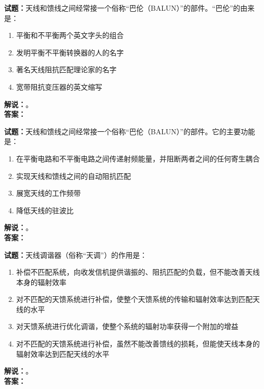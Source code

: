 \documentclass{ctexbook}
\begin{document}
\vspace{\baselineskip}

\noindent\textbf{试题：}天线和馈线之间经常接一个俗称“巴伦（BALUN）”的部件。“巴伦”的由来是：
\begin{enumerate}[leftmargin=3em]
  \item 平衡和不平衡两个英文字头的组合
  \item 发明平衡不平衡转换器的人的名字
  \item 著名天线阻抗匹配理论家的名字
  \item 宽带阻抗变压器的英文缩写
\end{enumerate}
\noindent\textbf{解说：}\textbf{}。\\\noindent\textbf{答案：}

\vspace{\baselineskip}

\noindent\textbf{试题：}天线和馈线之间经常接一个俗称“巴伦（BALUN）”的部件。它的主要功能是：
\begin{enumerate}[leftmargin=3em]
  \item 在平衡电路和不平衡电路之间传递射频能量，并阻断两者之间的任何寄生耦合
  \item 实现天线和馈线之间的自动阻抗匹配
  \item 展宽天线的工作频带
  \item 降低天线的驻波比
\end{enumerate}
\noindent\textbf{解说：}\textbf{}。\\\noindent\textbf{答案：}

\vspace{\baselineskip}

\noindent\textbf{试题：}天线调谐器（俗称“天调”）的作用是：
\begin{enumerate}[leftmargin=3em]
  \item 补偿不匹配系统，向收发信机提供谐振的、阻抗匹配的负载，但不能改善天线本身的辐射效率
  \item 对不匹配的天馈系统进行补偿，使整个天馈系统的传输和辐射效率达到匹配天线的水平
  \item 对天馈系统进行优化调谐，使整个系统的辐射功率获得一个附加的增益
  \item 对不匹配的天馈系统进行补偿，虽然不能改善馈线的损耗，但能使天线本身的辐射效率达到匹配天线的水平
\end{enumerate}
\noindent\textbf{解说：}\textbf{}。\\\noindent\textbf{答案：}

\vspace{\baselineskip}
\end{document}
